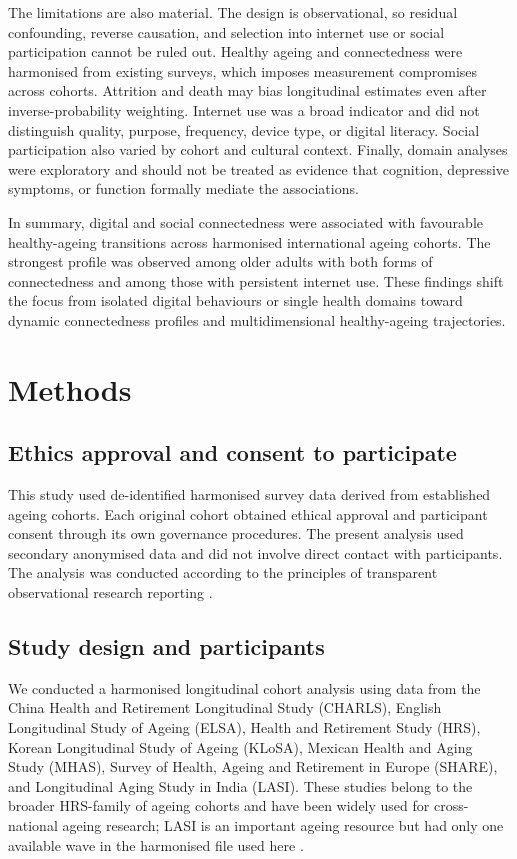 \documentclass[pdflatex,sn-nature]{sn-jnl}
\begin{document}
The limitations are also material. The design is observational, so residual confounding, reverse causation, and selection into internet use or social participation cannot be ruled out. Healthy ageing and connectedness were harmonised from existing surveys, which imposes measurement compromises across cohorts. Attrition and death may bias longitudinal estimates even after inverse-probability weighting. Internet use was a broad indicator and did not distinguish quality, purpose, frequency, device type, or digital literacy. Social participation also varied by cohort and cultural context. Finally, domain analyses were exploratory and should not be treated as evidence that cognition, depressive symptoms, or function formally mediate the associations.

In summary, digital and social connectedness were associated with favourable healthy-ageing transitions across harmonised international ageing cohorts. The strongest profile was observed among older adults with both forms of connectedness and among those with persistent internet use. These findings shift the focus from isolated digital behaviours or single health domains toward dynamic connectedness profiles and multidimensional healthy-ageing trajectories.

\section{Methods}

\subsection{Ethics approval and consent to participate}

This study used de-identified harmonised survey data derived from established ageing cohorts. Each original cohort obtained ethical approval and participant consent through its own governance procedures. The present analysis used secondary anonymised data and did not involve direct contact with participants. The analysis was conducted according to the principles of transparent observational research reporting \cite{elm2007strengthenin}.

\subsection{Study design and participants}

We conducted a harmonised longitudinal cohort analysis using data from the China Health and Retirement Longitudinal Study (CHARLS), English Longitudinal Study of Ageing (ELSA), Health and Retirement Study (HRS), Korean Longitudinal Study of Ageing (KLoSA), Mexican Health and Aging Study (MHAS), Survey of Health, Ageing and Retirement in Europe (SHARE), and Longitudinal Aging Study in India (LASI). These studies belong to the broader HRS-family of ageing cohorts and have been widely used for cross-national ageing research; LASI is an important ageing resource but had only one available wave in the harmonised file used here \cite{bloom2021longitudinal}.
\end{document}
